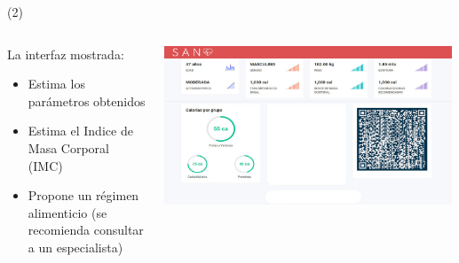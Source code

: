 \begin{frame}{ (2)}
\begin{columns}
\begin{column}{0.35\textwidth}
La interfaz mostrada:
	\begin{itemize}
\item Estima los parámetros obtenidos
\item Estima el Indice de Masa Corporal (IMC)
\item Propone un régimen alimenticio (se recomienda consultar a un especialista)
	\end{itemize}
\end{column}
\begin{column}{0.65\textwidth}
\begin{center}
     \includegraphics[width=0.99\textwidth]{Figs/Bascula2}
     \end{center}
\end{column}

\end{columns}
\end{frame}



